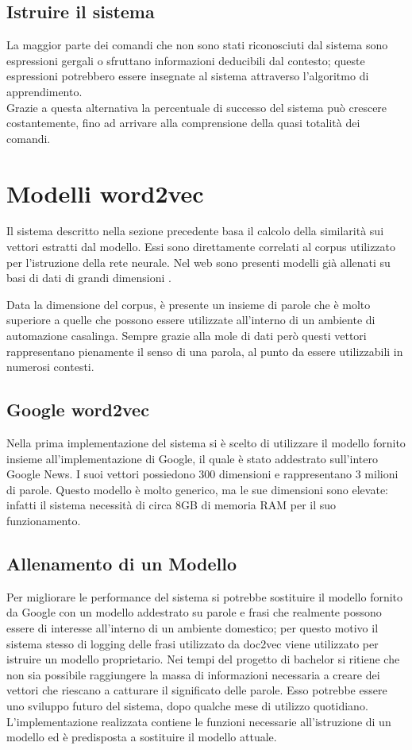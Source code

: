 \documentclass[twoside]{supsistudent}
\begin{document}
\section{Istruire il sistema}
La maggior parte dei comandi che non sono stati riconosciuti dal sistema sono espressioni gergali o sfruttano informazioni deducibili dal contesto; queste espressioni potrebbero essere insegnate al sistema attraverso l'algoritmo di apprendimento. \\
Grazie a questa alternativa la percentuale di successo del sistema può crescere costantemente, fino ad arrivare alla comprensione della quasi totalità dei comandi.
\chapter{Modelli word2vec}
Il sistema descritto nella sezione precedente basa il calcolo della similarità sui vettori estratti dal modello. Essi sono direttamente correlati al corpus \cite{corpus} utilizzato per l'istruzione della rete neurale. Nel web sono presenti modelli già allenati su basi di dati di grandi dimensioni \cite{trained_models}.

Data la dimensione del corpus, è presente un insieme di parole che è molto superiore a quelle che possono essere utilizzate all'interno di un ambiente di automazione casalinga. Sempre grazie alla mole di dati però questi vettori rappresentano pienamente il senso di una parola, al punto da essere utilizzabili in numerosi contesti.
\section{Google word2vec}
Nella prima implementazione del sistema si è scelto di utilizzare il modello fornito insieme all'implementazione di Google, il quale è stato addestrato sull'intero Google News. I suoi vettori possiedono 300 dimensioni e rappresentano 3 milioni di parole. Questo modello è molto generico, ma le sue dimensioni sono elevate: infatti il sistema necessità di circa 8GB di memoria RAM per il suo funzionamento.
\section{Allenamento di un Modello}
Per migliorare le performance del sistema si potrebbe sostituire il modello fornito da Google con un modello addestrato su parole e frasi che realmente possono essere di interesse all'interno di un ambiente domestico; per questo motivo il sistema stesso di logging delle frasi utilizzato da doc2vec viene utilizzato per istruire un modello proprietario. Nei tempi del progetto di bachelor si ritiene che non sia possibile raggiungere la massa di informazioni necessaria a creare dei vettori che riescano a catturare il significato delle parole. Esso potrebbe essere uno sviluppo futuro del sistema, dopo qualche mese di utilizzo quotidiano. L'implementazione realizzata contiene le funzioni necessarie all'istruzione di un modello ed è predisposta a sostituire il modello attuale.
\end{document}
